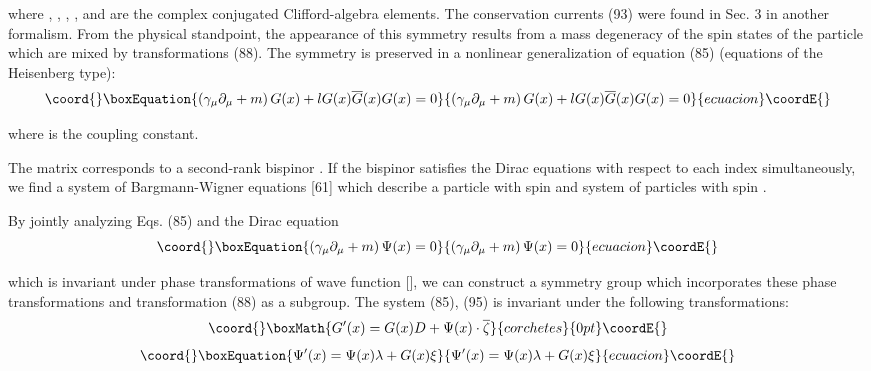 \documentclass[a4paper,12pt]{article}
\begin{document}
where \coordHE{}  \coordHE{}, \myHighlight{$\gamma _\mu $}\coordHE{}, \coordHE{}, \coordHE{}, \coordHE{} and \coordHE{} are the
complex conjugated Clifford-algebra elements. The conservation currents (93)
were found in Sec. 3 in another formalism. From the physical standpoint, the
appearance of this symmetry results from a mass degeneracy of the spin
states of the particle which are mixed by transformations (88). The symmetry
is preserved in a nonlinear generalization of equation (85) (equations of
the Heisenberg type):
\begin{equation}\coord{}\boxEquation{
\left( \gamma _\mu \partial _\mu +m\right) G(x)+lG(x)\overline{G}(x)G(x)=0
\label{94}
}{
\left( \gamma _\mu \partial _\mu +m\right) G(x)+lG(x)\overline{G}(x)G(x)=0
}{ecuacion}\coordE{}\end{equation}

where \coordHE{} is the coupling constant.

The matrix \coordHE{} corresponds to a second-rank bispinor \coordHE{}.
If the bispinor satisfies the Dirac equations with respect to each index
simultaneously, we find a system of Bargmann-Wigner equations [61] which
describe a particle with spin \coordHE{} and system of particles with spin \coordHE{}.

By jointly analyzing Eqs. (85) and the Dirac equation
\begin{equation}\coord{}\boxEquation{
\left( \gamma _\mu \partial _\mu +m\right) \Psi (x)=0  \label{95}
}{
\left( \gamma _\mu \partial _\mu +m\right) \Psi (x)=0  }{ecuacion}\coordE{}\end{equation}

which is invariant under phase transformations of wave function
\coordHE{} [\coordHE{}], we can construct a symmetry group which incorporates
these phase transformations and transformation (88) as a subgroup.
The system (85), (95) is invariant under the following
transformations:
\[\coord{}\boxMath{
G^{\prime }(x)=G(x)D+\Psi (x)\cdot \overline{\zeta }
}{corchetes}{0pt}\coordE{}\]
\begin{equation}\coord{}\boxEquation{
\Psi ^{\prime }(x)=\Psi (x)\lambda +G(x)\xi  \label{96}
}{
\Psi ^{\prime }(x)=\Psi (x)\lambda +G(x)\xi  }{ecuacion}\coordE{}\end{equation}
\end{document}
